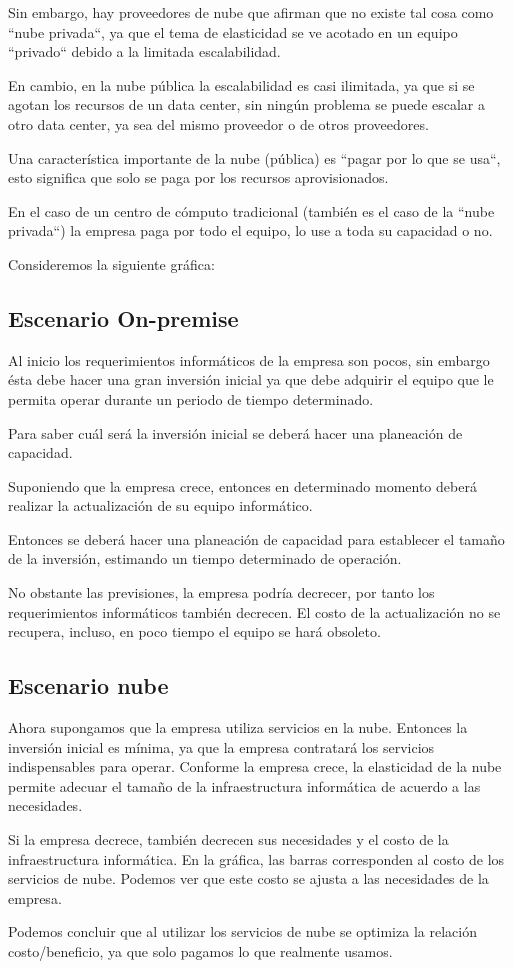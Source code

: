 \documentclass[11pt,a4paper,oneside]{book}
\begin{document}
Sin embargo, hay proveedores de nube que afirman que no existe tal cosa como ``nube privada``, ya que el tema de elasticidad se ve acotado en un equipo ``privado`` debido a la limitada escalabilidad.

En cambio, en la nube pública la escalabilidad es casi ilimitada, ya que si se agotan los recursos de un data center, sin ningún problema se puede escalar a otro data center, ya sea del mismo proveedor o de otros proveedores.

Una característica importante de la nube (pública) es ``pagar por lo que se usa``, esto significa que solo se paga por los recursos aprovisionados.

En el caso de un centro de cómputo tradicional (también es el caso de la ``nube privada``) la empresa paga por todo el equipo, lo use a toda su capacidad o no.

Consideremos la siguiente gráfica:

\subsection{Escenario On-premise}

Al inicio los requerimientos informáticos de la empresa son pocos, sin embargo ésta debe hacer una gran inversión inicial ya que debe adquirir el equipo que le permita operar durante un periodo de tiempo determinado.

Para saber cuál será la inversión inicial  se deberá hacer una planeación de capacidad.

Suponiendo que la empresa crece, entonces en determinado momento deberá realizar la actualización de su equipo informático.

Entonces se deberá hacer una planeación de capacidad para establecer el tamaño de la inversión, estimando un tiempo determinado de operación.

No obstante las previsiones, la empresa podría decrecer, por tanto los requerimientos informáticos también decrecen. El costo de la actualización no se recupera, incluso, en poco tiempo el equipo se hará obsoleto.

\subsection{Escenario nube}

Ahora supongamos que la empresa utiliza servicios en la nube. Entonces la inversión inicial es mínima, ya que la empresa contratará los servicios indispensables para operar. Conforme la empresa crece, la elasticidad de la nube permite adecuar el tamaño de la infraestructura informática de acuerdo a las necesidades.

Si la empresa decrece, también decrecen sus necesidades y el costo de la infraestructura informática. En la gráfica, las barras corresponden al costo de los servicios de nube. Podemos ver que este costo se ajusta a las necesidades de la empresa.

Podemos concluir que al utilizar los servicios de nube se optimiza la relación costo/beneficio, ya que solo pagamos lo que realmente usamos.
\end{document}
